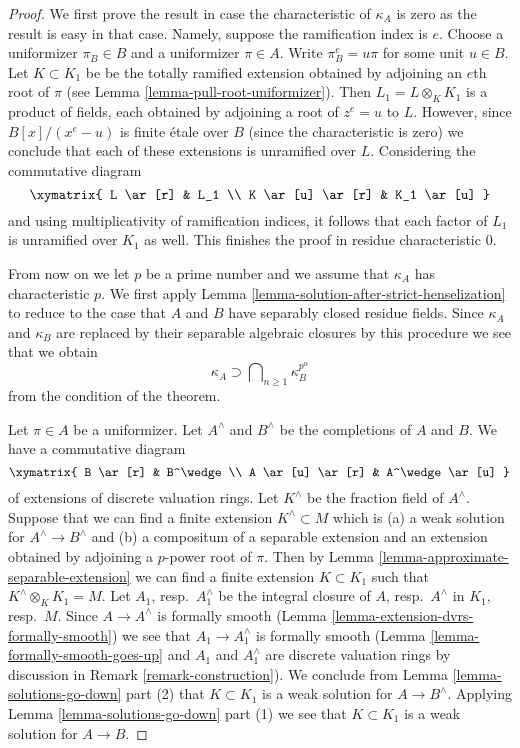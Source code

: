 \begin{proof}
We first prove the result in case the characteristic of $\kappa_A$ is zero
as the result is easy in that case. Namely, suppose the ramification index
is $e$. Choose a uniformizer $\pi_B \in B$ and a uniformizer $\pi \in A$.
Write $\pi_B^e = u\pi$ for some unit $u \in B$. Let $K \subset K_1$ be
be the totally ramified extension obtained by adjoining an $e$th root of
$\pi$ (see Lemma \ref{lemma-pull-root-uniformizer}).
Then $L_1 = L \otimes_K K_1$ is a product of
fields, each obtained by adjoining a root of $z^e = u$ to $L$. However,
since $B[x]/(x^e - u)$ is finite \'etale over $B$ (since the characteristic
is zero) we conclude that each of these extensions is unramified over $L$.
Considering the commutative diagram
$$
\xymatrix{
L \ar[r] & L_1 \\
K \ar[u] \ar[r] & K_1 \ar[u]
}
$$
and using multiplicativity of ramification indices, it follows that each
factor of $L_1$ is unramified over $K_1$ as well. This finishes the proof
in residue characteristic $0$.

\medskip\noindent
From now on we let $p$ be a prime number and we assume that $\kappa_A$ has
characteristic $p$. We first apply
Lemma \ref{lemma-solution-after-strict-henselization}
to reduce to the case that $A$ and $B$ have separably closed residue fields.
Since $\kappa_A$ and $\kappa_B$ are replaced by their separable algebraic
closures by this procedure we see that we obtain
$$
\kappa_A \supset \bigcap\nolimits_{n \geq 1} \kappa_B^{p^n}
$$
from the condition of the theorem.

\medskip\noindent
Let $\pi \in A$ be a uniformizer. Let $A^\wedge$ and $B^\wedge$ be the
completions of $A$ and $B$. We have a commutative diagram
$$
\xymatrix{
B \ar[r] & B^\wedge \\
A \ar[u] \ar[r] & A^\wedge \ar[u]
}
$$
of extensions of discrete valuation rings. Let $K^\wedge$ be the fraction
field of $A^\wedge$. Suppose that we can find a finite extension
$K^\wedge \subset M$ which is (a) a weak solution for $A^\wedge \to B^\wedge$
and (b) a compositum of a separable extension and an extension obtained
by adjoining a $p$-power root of $\pi$. Then by
Lemma \ref{lemma-approximate-separable-extension}
we can find a finite extension $K \subset K_1$ such that
$K^\wedge \otimes_K K_1 = M$. Let $A_1$, resp.\ $A_1^\wedge$
be the integral closure of $A$, resp.\ $A^\wedge$ in $K_1$, resp.\ $M$.
Since $A \to A^\wedge$ is formally smooth
(Lemma \ref{lemma-extension-dvrs-formally-smooth})
we see that $A_1 \to A_1^\wedge$ is formally smooth
(Lemma \ref{lemma-formally-smooth-goes-up} and
$A_1$ and $A_1^\wedge$ are discrete valuation
rings by discussion in Remark \ref{remark-construction}).
We conclude from Lemma \ref{lemma-solutions-go-down} part (2)
that $K \subset K_1$ is a weak solution for $A \to B^\wedge$.
Applying Lemma \ref{lemma-solutions-go-down} part (1)
we see that $K \subset K_1$ is a weak solution for $A \to B$.


\end{proof}
